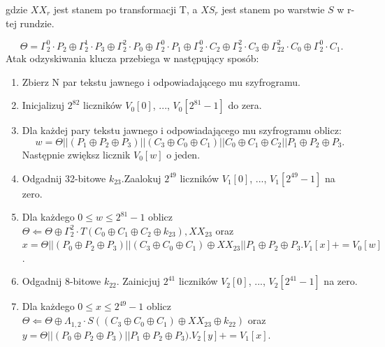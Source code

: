 gdzie $XX_r$ jest stanem po transformacji T, a $XS_r$  jest stanem po warstwie $S$ w r-tej rundzie.

\begin{equation*}
   \Theta = \Gamma^{0}_{2} \cdot P_{2} \oplus \Gamma^{1}_{2} \cdot P_{3} \oplus \Gamma^{2}_{2} \cdot P_{0} \oplus \Gamma^{0}_{2} \cdot P_{1} \oplus \Gamma^{0}_{2} \cdot C_{2} \oplus \Gamma^{2}_{2} \cdot C_{3} \oplus \Gamma^{2}_{22} \cdot C_{0} \oplus \Gamma^{0}_{2} \cdot C_{1}.
\end{equation*}
Atak odzyskiwania klucza przebiega w następujący sposób:\\
\begin{enumerate}
    \item Zbierz N par tekstu jawnego i odpowiadającego mu szyfrogramu.\\
    \item Inicjalizuj $2^{82}$ liczników $V_0[0]$, ..., $V_0[2^{81}-1]$ do zera.\\
    \item Dla każdej pary tekstu jawnego i odpowiadającego mu szyfrogramu oblicz:
    \begin{equation*}
   w = \Theta || (P_{1} \oplus P_{2} \oplus P_{3})  || (C_{3} \oplus C_{0} \oplus C_{1}) || C_{0} \oplus C_{1} \oplus C_{2} || P_{1} \oplus P_{2} \oplus P_{3}.
   \end{equation*} 
   Następnie zwiększ licznik $V_0[w]$ o jeden.\\
    \item Odgadnij 32-bitowe $k_{23}$.Zaalokuj $2^{49}$ liczników $V_1[0]$, ..., $V_1[2^{49}-1]$ na zero.\\
    \item Dla każdego $0\leq w \leq 2^{81}-1 $ oblicz $\Theta \Leftarrow \Theta \oplus \Gamma^{2}_{2} \cdot T(C_{0} \oplus C_{1} \oplus C_{2} \oplus k_{23}), XX_{23}$ oraz $x=\Theta || (P_{0} \oplus P_{2} \oplus P_{3}) || (C_{3} \oplus C_{0} \oplus C_{1}) \oplus XX_{23} || P_{1} \oplus P_{2} \oplus P_{3}. V_1[x]+=V_0[w]$.\\
    \item Odgadnij 8-bitowe $k_{22}$. Zainicjuj $2^{41}$ liczników $V_2[0]$, ..., $V_2[2^{41}-1]$ na zero.\\
    \item Dla każdego $0\leq x \leq 2^{49}-1 $ oblicz $\Theta \Leftarrow \Theta \oplus \Lambda_{1,2} \cdot S((C_{3} \oplus C_{0} \oplus C_{1})\oplus XX_{23} \oplus k_{22})$ oraz $y=\Theta || (P_{0} \oplus P_{2} \oplus P_{3}) || P_{1} \oplus P_{2} \oplus P_{3}). V_2[y]+=V_1[x]$.\\

\end{enumerate}
